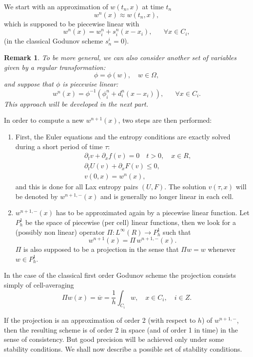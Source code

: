 \documentclass{fldauth}
\theoremstyle{plain}
\theoremstyle{plain}
\theoremstyle{plain}
\theoremstyle{plain}
\theoremstyle{plain}
\newtheorem{rem}{Remark}
\theoremstyle{plain}
\begin{document}
We start with an approximation of \( w(t_{n},x) \) at time \( t_{n} \)
\[
w^{n}(x)\approx w(t_{n},x),\]
 which is supposed to be piecewise linear with
\[
w^{n}(x)=w_{i}^{n}+s_{i}^{n}(x-x_{i}),\quad \textrm{ }\forall x\in C_{i},\]
 (in the classical Godunov scheme \( s_{n}^{i}=0 \)).

\begin{rem}
\label{changevar}To be more general, we can also consider another set of variables
given by a regular transformation:
\[
\phi =\phi (w),\quad w\in \Omega ,\]
and suppose that \( \phi  \) is piecewise linear:
\[
w^{n}(x)=\phi ^{-1}(\phi _{i}^{n}+d_{i}^{n}(x-x_{i})),\quad \textrm{ }\forall x\in C_{i}.\]
This approach will be developed in the next part.
\end{rem}
In order to compute a new \( w^{n+1}(x) \), two steps are then performed:

\begin{enumerate}
\item First, the Euler equations and the entropy conditions are exactly solved during
a short period of time \( \tau : \)
\begin{eqnarray*}
 &  & \partial _{t}v+\partial _{x}f(v)=0\quad t>0,\quad x\in R,\\
 &  & \partial _{t}U(v)+\partial _{x}F(v)\leq 0,\\
 &  & v(0,x)=w^{n}(x),
\end{eqnarray*}
 and this is done for all Lax entropy pairs \( (U,F) \). The solution \( v(\tau ,x) \)
will be denoted by \( w^{n+1,-}(x) \) and is generally no longer linear in
each cell.
\item \( w^{n+1,-}(x) \) has to be approximated again by a piecewise linear function.
Let \( P^{1}_{h} \) be the space of piecewise (per cell) linear functions,
then we look for a (possibly non linear) operator \( \Pi :L^{\infty }(R)\rightarrow P^{1}_{h} \)
such that
\[
w^{n+1}(x)=\Pi \, w^{n+1,-}(x).\]
 \( \Pi  \) is also supposed to be a projection in the sense that \( \Pi w=w \)
whenever \( w\in P^{1}_{h} \).
\end{enumerate}
In the case of the classical first order Godunov scheme the projection consists
simply of cell-averaging
\[
\Pi w(x)=\overline{w}=\frac{1}{h}\int _{C_{i}}w,\quad x\in C_{i},\quad i\in Z.\]


If the projection is an approximation of order 2 (with respect to \( h \))
of \( w^{n+1,-} \), then the resulting scheme is of order 2 in space (and of
order 1 in time) in the sense of consistency. But good precision will be achieved
only under some stability conditions. We shall now describe a possible set of
stability conditions.
\end{document}
